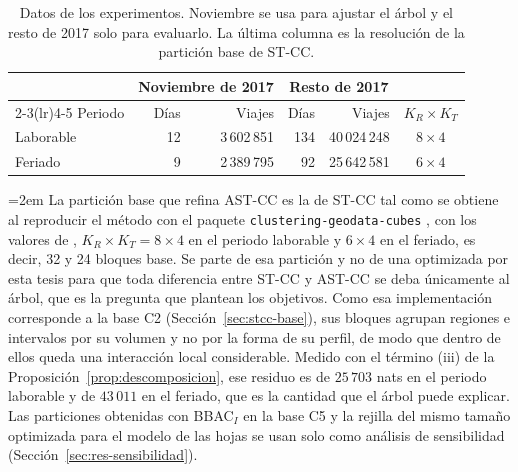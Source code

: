 \begin{table}[t]
\centering
\small
\begin{tabular}{lrrrrc}
\toprule
 & \multicolumn{2}{c}{Noviembre de 2017} & \multicolumn{2}{c}{Resto de 2017} & \\
\cmidrule(lr){2-3}\cmidrule(lr){4-5}
Periodo & Días & Viajes & Días & Viajes & $K_R \times K_T$ \\
\midrule
Laborable & 12 & 3\,602\,851 & 134 & 40\,024\,248 & $8 \times 4$ \\
Feriado   &  9 & 2\,389\,795 &  92 & 25\,642\,581 & $6 \times 4$ \\
\bottomrule
\end{tabular}
\caption{Datos de los experimentos. Noviembre se usa para ajustar el árbol y el
resto de 2017 solo para evaluarlo. La última columna es la resolución de la
partición base de ST-CC.}
\label{tab:res-datos}
\end{table}

{\emergencystretch=2em
La partición base que refina AST-CC es la de ST-CC tal como se obtiene al
reproducir el método con el paquete \texttt{clustering-geodata-cubes}
\citep{Nattino2022}, con los valores de \citet{Liu2021}, $K_R \times K_T = 8 \times 4$ en el periodo laborable y
$6 \times 4$ en el feriado, es decir, 32 y 24 bloques base. Se parte de esa
partición y no de una optimizada por esta tesis para que toda diferencia entre
ST-CC y AST-CC se deba únicamente al árbol, que es la pregunta que plantean los
objetivos. Como esa implementación corresponde a la base C2
(Sección~\ref{sec:stcc-base}), sus bloques agrupan regiones e intervalos por su
volumen y no por la forma de su perfil, de modo que dentro de ellos queda una
interacción local considerable. Medido con el término (iii) de la
Proposición~\ref{prop:descomposicion}, ese residuo es de $25\,703$ nats en el
periodo laborable y de $43\,011$ en el feriado, que es la cantidad que el árbol
puede explicar. Las particiones obtenidas con BBAC$_I$ en la base C5 y la rejilla
del mismo tamaño optimizada para el modelo de las hojas se usan solo como análisis
de sensibilidad (Sección~\ref{sec:res-sensibilidad}).\par}

